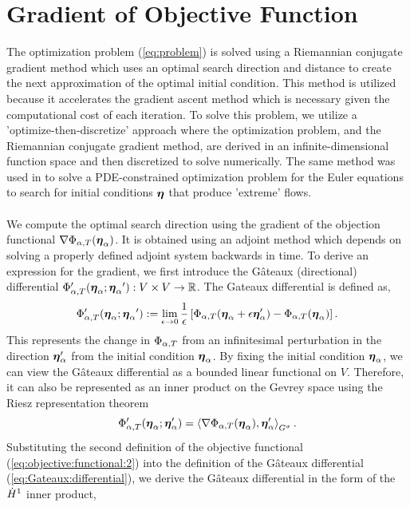 \section{Gradient of Objective Function} \label{sec:Gateaux Directional Differential}
 
The optimization problem (\ref{eq:problem}) is solved using a Riemannian conjugate gradient method which uses an optimal search direction and distance to create the next approximation of the optimal initial condition. This method is utilized because it accelerates the gradient ascent method which is necessary given the computational cost of each iteration. To solve this problem, we utilize a 'optimize-then-discretize' approach where the optimization problem, and the Riemannian conjugate gradient method, are derived in an infinite-dimensional function space and then discretized to solve numerically. The same method was used in \cite{zhao_systematic_2023} to solve a PDE-constrained optimization problem for the Euler equations to search for initial conditions ${\boldsymbol \eta}$ that produce 'extreme' flows. 
\\~\\
We compute the optimal search direction using the gradient of the objection functional $\nabla\Phi_{\alpha,T}({\boldsymbol \eta_\alpha})$. It is obtained using an adjoint method which depends on solving a properly defined adjoint system backwards in time. To derive an expression for the gradient, we first introduce the G\^{a}teaux (directional) differential $\Phi'_{\alpha,T}({\boldsymbol \eta_\alpha};{\boldsymbol \eta_\alpha}'): V\times V \rightarrow \mathbb{R}$. The Gateaux differential is defined as,
\begin{align}\label{eq:Gateaux:differential}
\Phi'_{\alpha,T}({\boldsymbol \eta_\alpha};{\boldsymbol \eta_\alpha}'):=\lim_{\epsilon\rightarrow 0}\frac{1}{\epsilon}\left[\Phi_{\alpha,T}({\boldsymbol \eta_\alpha}+\epsilon{\boldsymbol \eta'_\alpha})-\Phi_{\alpha,T}({\boldsymbol \eta_\alpha})\right].
\end{align}
This represents the change in $\Phi_{\alpha,T}$ from  an infinitesimal perturbation in the direction ${\boldsymbol \eta'_\alpha}$ from the initial condition ${\boldsymbol \eta_\alpha}$. By fixing the initial condition ${\boldsymbol \eta_\alpha}$, we can view the G\^{a}teaux differential as a bounded linear functional on $V$. Therefore, it can also be represented as an inner product on the Gevrey space using the Riesz representation theorem \cite{zhao_systematic_2023,luenberger_optimization_1969}
\begin{equation}\label{eq:Gateaux:differential:riesz}
\Phi'_{\alpha,T}({\boldsymbol \eta_\alpha};{\boldsymbol \eta'_\alpha}) = \left\langle \nabla\Phi_{\alpha,T}({\boldsymbol \eta_\alpha}),{\boldsymbol \eta'_\alpha}\right\rangle_{G^\sigma}.
\end{equation}
Substituting the second definition of the objective functional (\ref{eq:objective:functional:2}) into the definition of the G\^{a}teaux differential (\ref{eq:Gateaux:differential}), we derive the G\^{a}teaux differential in the form of the $\dot{H}^1$ inner product,
